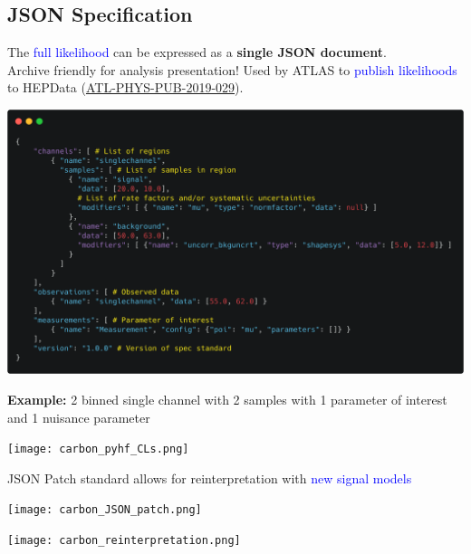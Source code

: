 \documentclass[a0,portrait]{a0poster}
\begin{document}
\begin{multicols}{2}
 \section*{\LARGE\color{MediumBlue} JSON Specification}
 The \textcolor{blue}{full likelihood} can be expressed as a \textbf{single JSON document}.\\Archive friendly for analysis presentation! Used by ATLAS to \textcolor{blue}{publish likelihoods} to HEPData (\textcolor{blue}{\href{https://atlas.web.cern.ch/Atlas/GROUPS/PHYSICS/PUBNOTES/ATL-PHYS-PUB-2019-029/}{ATL-PHYS-PUB-2019-029}}).
 \vspace{0.5em}
 \begin{center}
  \href{https://raw.githubusercontent.com/diana-hep/pyhf/master/examples/2-bin_1-channel.json}{\includegraphics[width=0.7\linewidth]{carbon_JSON_spec_annotated.png}}
 \end{center}
 \vspace{-1em}
 \begin{center}
  {\small\textbf{Example:} 2 binned single channel with 2 samples with 1 parameter of interest and 1 nuisance parameter}
 \end{center}
 \begin{center}
  \texttt{[image: carbon\_pyhf\_CLs.png]}
 \end{center}

 \begin{center}
  JSON Patch standard allows for reinterpretation with \textcolor{blue}{new signal models}
 \end{center}
 \begin{center}
  \texttt{[image: carbon\_JSON\_patch.png]}
 \end{center}
 \begin{center}
  \texttt{[image: carbon\_reinterpretation.png]}
 \end{center}


\end{multicols}
\end{document}
